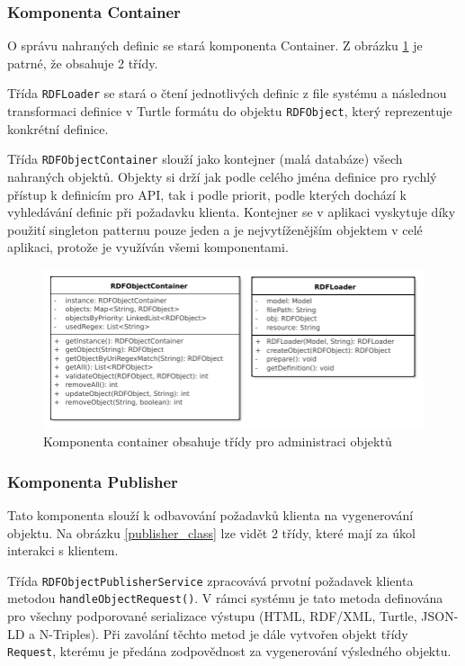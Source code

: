 \documentclass[thesis=B,czech]{FITthesis}[2012/06/26]
\begin{document}
 \subsubsection{Komponenta Container} \label{component_container}
 O správu nahraných definic se stará komponenta Container. Z obrázku \ref{container_class} je patrné, že obsahuje 2 třídy.
 
 Třída  \texttt{RDFLoader} se stará
 o čtení jednotlivých definic z file systému a následnou transformaci definice v Turtle formátu do objektu  \texttt{RDFObject},
 který reprezentuje konkrétní definice.
 
 Třída  \texttt{RDFObjectContainer} slouží jako kontejner (malá databáze) všech nahraných objektů. Objekty si drží jak podle celého jména definice pro rychlý přístup
 k definicím pro API, tak i podle priorit, podle kterých dochází k vyhledávání definic při požadavku klienta.
 Kontejner se v aplikaci vyskytuje díky použití singleton patternu
 pouze jeden a je nejvytíženějším objektem v celé aplikaci, protože je využíván všemi komponentami.
 
 \begin{figure}\centering
 	\includegraphics[width=\textwidth]{Container.pdf}
 	\caption[Model tříd komponenty container]{Komponenta container obsahuje třídy pro administraci objektů}\label{container_class}
    \end{figure}
    
    \subsubsection{Komponenta Publisher}\label{component_publisher}
    Tato komponenta slouží k odbavování požadavků klienta na vygenerování objektu. Na obrázku \ref{publisher_class} lze vidět 2 třídy,
    které mají za úkol interakci s klientem.
    
    Třída  \texttt{RDFObjectPublisherService} zpracovává prvotní požadavek klienta metodou \texttt{handleObjectRequest()}. V rámci systému je tato metoda definována
    pro všechny podporované serializace výstupu (HTML, RDF/XML, Turtle, JSON-LD a N-Triples). Při zavolání těchto metod je dále vytvořen 
    objekt třídy  \texttt{Request}, kterému je předána zodpovědnost za vygenerování výsledného objektu. 
    
\end{document}

